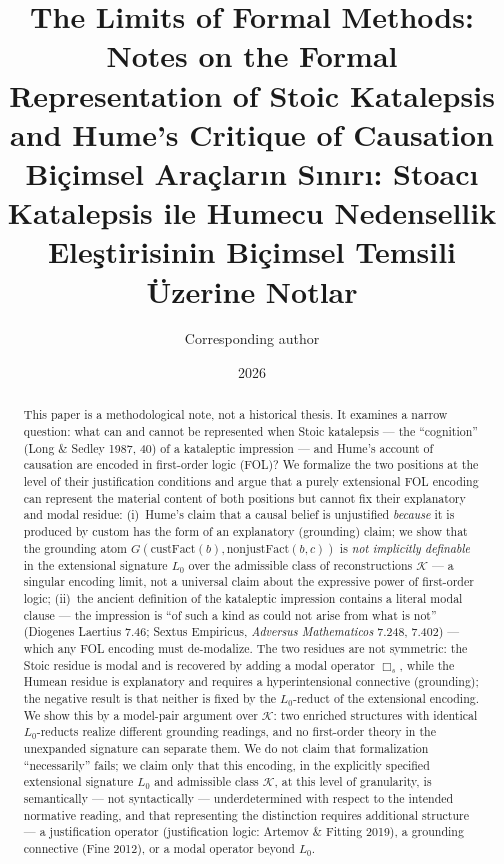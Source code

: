 \documentclass[11pt]{article}
\title{The Limits of Formal Methods: Notes on the Formal Representation
of Stoic Katalepsis and Hume's Critique of Causation\\[4pt]
\large Bi\c{c}imsel Ara\c{c}lar{\i}n S{\i}n{\i}r{\i}: Stoac{\i}
Katalepsis ile Humecu Nedensellik Ele\c{s}tirisinin Bi\c{c}imsel
Temsili \"Uzerine Notlar}
\author{Corresponding author}
\date{2026}
\theoremstyle{plain}
\theoremstyle{definition}
\theoremstyle{remark}
\begin{document}
\maketitle

\begin{abstract}
This paper is a methodological note, not a historical thesis. It
examines a narrow question: what can and cannot be represented when
Stoic katalepsis --- the ``cognition'' (Long \& Sedley 1987, 40) of a
kataleptic impression --- and Hume's account of causation are encoded
in first-order logic (FOL)? We formalize the two positions at the
level of their justification conditions and argue that a purely
extensional FOL encoding can represent the material content of both
positions but cannot fix their explanatory and modal residue:
(i)~Hume's claim that a causal belief is unjustified \emph{because} it
is produced by custom has the form of an explanatory (grounding)
claim; we show that the grounding atom
$G(\mathrm{custFact}(b),\mathrm{nonjustFact}(b,c))$ is \emph{not
implicitly definable} in the extensional signature $L_0$ over the
admissible class of reconstructions $\mathcal K$ --- a singular
encoding limit, not a universal claim about the expressive power of
first-order logic;
(ii)~the ancient definition of the kataleptic impression contains a
literal modal clause --- the impression is ``of such a kind as could
not arise from what is not'' (Diogenes Laertius 7.46; Sextus
Empiricus, \emph{Adversus Mathematicos} 7.248, 7.402) --- which any
FOL encoding must de-modalize. The two residues are not symmetric: the
Stoic residue is modal and is recovered by adding a modal operator
$\Box_s$, while the Humean residue is explanatory and requires a
hyperintensional connective (grounding); the negative result is that
neither is fixed by the $L_0$-reduct of the extensional encoding. We
show this by a model-pair argument over $\mathcal K$: two enriched
structures with identical $L_0$-reducts realize different grounding
readings, and no first-order theory in the unexpanded signature can
separate them. We do not claim that formalization ``necessarily''
fails; we claim only that this encoding, in the explicitly specified
extensional signature $L_0$ and admissible class $\mathcal K$, at this
level of granularity, is semantically --- not syntactically ---
underdetermined with respect to the intended normative reading, and
that representing the distinction requires additional structure --- a
justification operator (justification logic: Artemov \& Fitting 2019),
a grounding connective (Fine 2012), or a modal operator beyond $L_0$.

\end{abstract}
\end{document}
